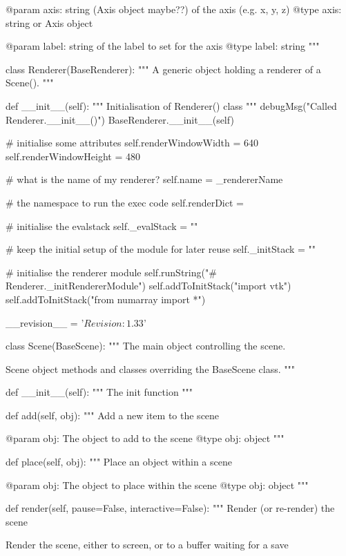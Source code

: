 \begin{python}
\begin{python}
\begin{verbose}
        @param axis: string (Axis object maybe??) of the axis (e.g. x, y, z)
        @type axis: string or Axis object

        @param label: string of the label to set for the axis
        @type label: string
        """

class Renderer(BaseRenderer):
    """
    A generic object holding a renderer of a Scene().
    """

    def __init__(self):
        """
        Initialisation of Renderer() class
        """
        debugMsg("Called Renderer.__init__()")
        BaseRenderer.__init__(self)

        # initialise some attributes
        self.renderWindowWidth = 640
        self.renderWindowHeight = 480

        # what is the name of my renderer?
        self.name = _rendererName

        # the namespace to run the exec code
        self.renderDict = {}

        # initialise the evalstack
        self._evalStack = ""

        # keep the initial setup of the module for later reuse
        self._initStack = ""

        # initialise the renderer module
        self.runString("# Renderer._initRendererModule")
        self.addToInitStack("import vtk")
        self.addToInitStack("from numarray import *")

__revision__ = '$Revision: 1.33 $'

class Scene(BaseScene):
    """
    The main object controlling the scene.
    
    Scene object methods and classes overriding the BaseScene class.
    """

    def __init__(self):
        """
        The init function
        """

    def add(self, obj):
        """
        Add a new item to the scene

        @param obj: The object to add to the scene
        @type obj: object
        """

    def place(self, obj):
        """
        Place an object within a scene

        @param obj: The object to place within the scene
        @type obj: object
        """

    def render(self, pause=False, interactive=False):
        """
        Render (or re-render) the scene
        
        Render the scene, either to screen, or to a buffer waiting for a save


\end{verbose}
\end{python}
\end{python}
